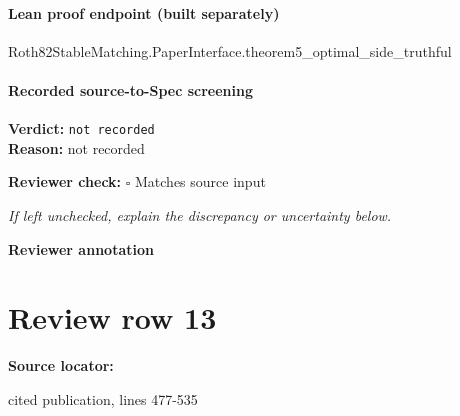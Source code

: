 \documentclass[10pt]{article}
\newcommand{\reviewerbox}{%
  \par\noindent\fbox{\parbox{0.96\linewidth}{\rule{0pt}{0.38in}}}\par
}
\newcommand{\reviewmatch}[1]{%
  \par\noindent\textbf{Reviewer check:} $\square$\; #1\par
  \noindent\emph{If left unchecked, explain the discrepancy or uncertainty below.}\par
}
\begin{document}
\paragraph{Lean proof endpoint (built separately)}\begin{ReviewVerbatim}
Roth82StableMatching.PaperInterface.theorem5_optimal_side_truthful
\end{ReviewVerbatim}

\paragraph{Recorded source-to-Spec screening}
\textbf{Verdict:} \texttt{not recorded}
\\
\textbf{Reason:} not recorded
\reviewmatch{Matches source input}
\noindent\textbf{Reviewer annotation}\par
\reviewerbox
\clearpage
\hypertarget{source-claim-b35add4c342a0889}{}
\section*{Review row 13}
\textbf{Source locator:} {\footnotesize\raggedright cited publication, lines 477-\allowbreak{}535\par}
\end{document}
